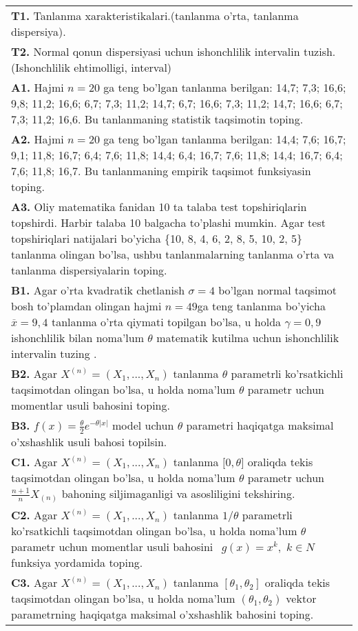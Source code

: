 \documentclass{article}
\begin{document}
\begin{tabular}{m{17cm}}
\textbf{T1.} 
Tanlanma xarakteristikalari.(tanlanma o'rta, tanlanma dispersiya).
\\
\textbf{T2.} 
Normal qonun dispersiyasi uchun ishonchlilik intervalin tuzish. (Ishonchlilik ehtimolligi, interval)
\\
\textbf{A1.} 
Hajmi \(n = 20\) ga teng bo'lgan tanlanma berilgan: 14,7; 7,3; 16,6; 9,8; 11,2; 16,6; 6,7; 7,3; 11,2; 14,7; 6,7; 16,6; 7,3; 11,2; 14,7; 16,6; 6,7; 7,3; 11,2; 16,6. Bu tanlanmaning statistik taqsimotin toping.
\\
\textbf{A2.} 
Hajmi \(n = 20\) ga teng bo'lgan tanlanma berilgan: 14,4; 7,6; 16,7; 9,1; 11,8; 16,7; 6,4; 7,6; 11,8; 14,4; 6,4; 16,7; 7,6; 11,8; 14,4; 16,7; 6,4; 7,6; 11,8; 16,7. Bu tanlanmaning empirik taqsimot funksiyasin toping.
\\
\textbf{A3.} 
Oliy matematika fanidan 10 ta talaba test topshiriqlarin topshirdi. Harbir talaba 10 balgacha to'plashi mumkin. Agar test topshiriqlari natijalari bo'yicha \{10, 8, 4, 6, 2, 8, 5, 10, 2, 5\} tanlanma olingan bo'lsa, ushbu tanlanmalarning tanlanma o'rta va tanlanma dispersiyalarin toping.
\\
\textbf{B1.} 
Agar o'rta kvadratik chetlanish \(\sigma = 4\) bo'lgan normal taqsimot bosh to'plamdan olingan hajmi \(n = 49\)ga teng tanlanma bo'yicha \(\overline{x} = 9,4\) tanlanma o'rta qiymati topilgan bo'lsa, u holda \(\gamma = 0,9\) ishonchlilik bilan noma'lum \(\theta\) matematik kutilma uchun ishonchlilik intervalin tuzing .
\\
\textbf{B2.} 
Agar \(X^{(n)} = \left( X_{1},...,X_{n} \right)\) tanlanma \(\theta\) parametrli ko'rsatkichli taqsimotdan olingan bo'lsa, u holda noma'lum \(\theta\) parametr uchun momentlar usuli bahosini toping.
\\
\textbf{B3.} 
\(f(x) = \frac{\theta}{2}e^{- \theta|x|}\) model uchun \(\theta\) parametri haqiqatga maksimal o'xshashlik usuli bahosi topilsin.
\\
\textbf{C1.} 
Agar \(X^{(n)} = \left( X_{1},...,X_{n} \right)\) tanlanma \(\lbrack 0,\theta\rbrack\) oraliqda tekis taqsimotdan olingan bo'lsa, u holda noma'lum \(\theta\) parametr uchun \(\frac{n + 1}{n}X_{(n)}\) bahoning siljimaganligi va asosliligini tekshiring.
\\
\textbf{C2.} 
Agar \(X^{(n)} = \left( X_{1},...,X_{n} \right)\) tanlanma \(1/\theta\) parametrli ko'rsatkichli taqsimotdan olingan bo'lsa, u holda noma'lum \(\theta\) parametr uchun momentlar usuli bahosini \(\ \ g(x) = x^{k},\) \(k \in N\) funksiya yordamida toping.
\\
\textbf{C3.} 
Agar \(X^{(n)} = \left( X_{1},...,X_{n} \right)\) tanlanma \(\left\lbrack \theta_{1},\theta_{2} \right\rbrack\) oraliqda tekis taqsimotdan olingan bo'lsa, u holda noma'lum \(\left( \theta_{1},\theta_{2} \right)\) vektor parametrning haqiqatga maksimal o'xshashlik bahosini toping.
\\

\end{tabular}
\vspace{1cm}
\end{document}
